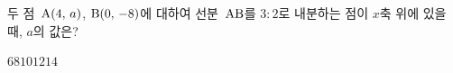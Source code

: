 두 점~$\mathrm{A}(4,\mkern3mu a)$, $\mathrm{B}(0,\mkern3mu -8)$에 대하여 선분~$\mathrm{AB}$를 $3:2$로 내분하는 점이 $x$축 위에 있을 때, $a$의 값은?
\begin{choices32}{$6$}{$8$}{$10$}{$12$}{$14$}\end{choices32}
